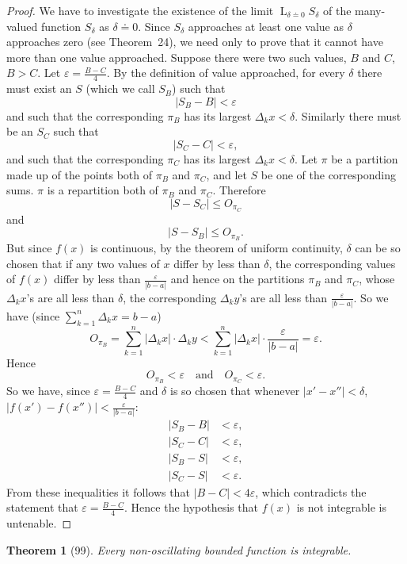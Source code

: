 \documentclass[a4paper,12pt]{book}[2004/02/16]
\providecommand{\leqq}{\leq}
\providecommand{\hyperlink}[2]{#2}
\providecommand{\hypertarget}[2]{#2}
\theoremstyle{ilemma}
\theoremstyle{itheorem}
\newtheorem{theorem}{Theorem}
\theoremstyle{iother}
\theoremstyle{icorollary}
\theoremstyle{numcorollary}
\theoremstyle{idefinition}
\renewcommand{\dfrac}[2]{\frac{#1}{#2}}%
\begin{document}
\begin{proof}
We have to investigate the existence of the limit
$\displaystyle\mathop{L}_{\delta\doteq 0} S_\delta$ of the many-valued
function $S_\delta$ as $\delta\doteq 0$. Since $S_\delta$ approaches
at least one value as $\delta$ approaches zero (see Theorem~\hyperlink{thm24}{24}), we
need only to prove that it cannot have more than one value
approached. Suppose there were two such values, $B$ and $C$,
$B>C$. Let $\varepsilon=\dfrac{B-C}{4}$. By the definition of value
approached, for every $\delta$ there must exist an $S$ (which we call
$S_B$) such that
\[
\tag{1}
  |S_B-B|<\varepsilon
\]
and such that the corresponding $\pi_B$ has its largest
$\Delta_kx<\delta$.  Similarly there must be an $S_C$ such that
\[
\tag{2}
  |S_C-C|<\varepsilon,
\]
and such that the corresponding $\pi_C$ has its largest
$\Delta_kx<\delta$. Let $\pi$ be a partition made up of the points
both of $\pi_B$ and $\pi_C$, and let $S$ be one of the corresponding
sums. $\pi$ is a repartition both of $\pi_B$ and $\pi_C$.
Therefore
\[
\tag{3}
  |S-S_C|\leqq O_{\pi_C}
\]
and
\hypertarget{eq4p158}{\[
\tag{4}
  |S-S_B| \leqq O_{\pi_B}.
\]}
But since $f(x)$ is continuous, by the theorem of uniform continuity,
$\delta$ can be so chosen that if any two values of $x$ differ by less
than $\delta$, the corresponding values of $f(x)$ differ by less than
$\dfrac{\varepsilon}{|b-a|}$ and hence on the partitions $\pi_B$ and
$\pi_C$, whose $\Delta_kx$'s are all less than $\delta$, the
corresponding $\Delta_ky$'s are all less than
$\dfrac{\varepsilon}{|b-a|}$. So we have (since
$\displaystyle\sum_{k=1}^n \Delta_kx=b-a$)
\[
  O_{\pi_B} = \sum_{k=1}^n|\Delta_kx| \cdot \Delta_ky <
  \sum_{k=1}^n|\Delta_kx| \cdot \frac{\varepsilon}{|b-a|} =
  \varepsilon.
\]
Hence
\[
  O_{\pi_B}<\varepsilon \quad \text{and}\quad O_{\pi_C} < \varepsilon.
\]
So we have, since $\varepsilon=\dfrac{B-C}{4}$ and $\delta$ is so
chosen that whenever $|x'-x''| < \delta$, $|f(x')-f(x'')| <
\dfrac{\varepsilon}{|b-a|}$:
\begin{align*}
  |S_B-B| &< \varepsilon, \\
  |S_C-C| &< \varepsilon, \\
  |S_B-S| &< \varepsilon, \\
  |S_C-S| &< \varepsilon.
\end{align*}
From these inequalities it follows that $|B-C|<4\varepsilon$, which
contradicts the statement that $\varepsilon=\dfrac{B-C}{4}$. Hence the
hypothesis that $f(x)$ is not integrable is untenable.
\end{proof}
\begin{theorem}[99]\hypertarget{thm99}{}
Every non-oscillating bounded function is integrable.
\end{theorem}
\end{document}
